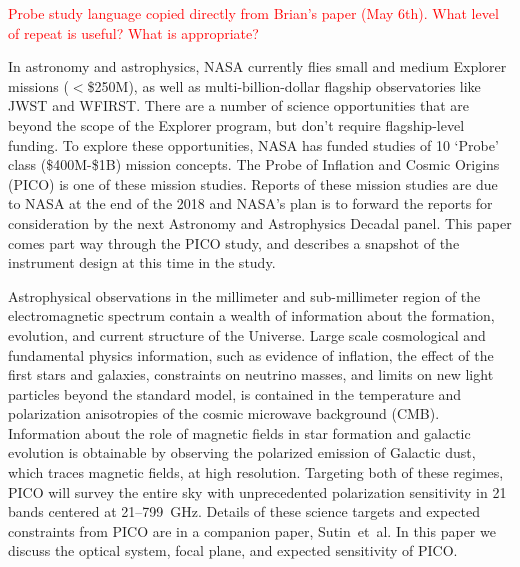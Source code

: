\documentclass[]{spie}  %
\newcommand{\comr}[1]{\textcolor{red}{#1}}
\begin{document}
\comr{Probe study language copied directly from Brian's paper (May 6th).  What level of repeat is useful?  What is appropriate?}

In astronomy and astrophysics, NASA currently flies small and medium Explorer missions ($<$\$250M), as well as multi-billion-dollar flagship observatories like JWST and WFIRST. There are a number of science opportunities that are beyond the scope of the Explorer program, but don't require flagship-level funding. To explore these opportunities, NASA has funded studies of 10 `Probe' class (\$400M-\$1B) mission concepts. The Probe of Inflation and Cosmic Origins (PICO) is one of these mission studies. Reports of these mission studies are due to NASA at the end of the 2018 and NASA's plan is to forward the reports for consideration by the next Astronomy and Astrophysics Decadal panel. This paper comes part way through the PICO study, and describes a snapshot of the  instrument design at this time in the study.

Astrophysical observations in the  millimeter and sub-millimeter region of the electromagnetic spectrum contain a wealth of information about 
the formation, evolution, and current structure of the Universe.  Large scale cosmological and fundamental physics information, such as 
evidence of inflation, the effect of the first stars and galaxies, constraints on neutrino masses, and limits on new light particles beyond 
the standard model, is contained in the temperature and polarization anisotropies of the cosmic microwave background (CMB).  Information 
about the role of magnetic fields in star formation and galactic evolution is obtainable by observing the polarized emission of Galactic dust, which 
traces magnetic fields, at high resolution. Targeting both of these regimes, PICO will survey the entire sky with unprecedented polarization sensitivity 
in 21 bands centered at 21--799~GHz.  Details of these science targets and expected constraints from PICO are in a companion paper, Sutin~et~al.\cite{brian_spie} 
In this paper we discuss the optical system, focal plane, and expected sensitivity of PICO.

\end{document}

